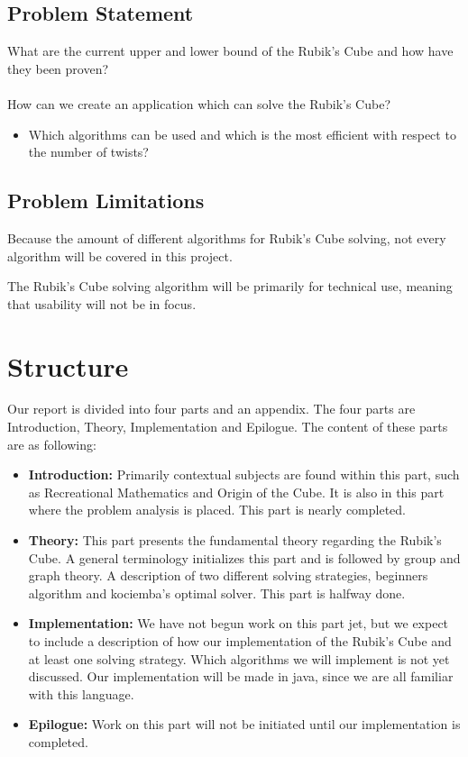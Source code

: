 \documentclass{article}
\begin{document}
\subsection{Problem Statement}
What are the current upper and lower bound of the Rubik's Cube and how have they been proven? \\
\\
How can we create an application which can solve the Rubik's Cube?
\begin{itemize}
	\item Which algorithms can be used and which is the most efficient with respect to the number of twists?
\end{itemize}

\subsection{Problem Limitations}
Because the amount of different algorithms for Rubik's Cube solving, not every algorithm will be covered in this project.

The Rubik's Cube solving algorithm will be primarily for technical use, meaning that usability will not be in focus.

\section{Structure}
Our report is divided into four parts and an appendix. The four parts are Introduction, Theory, Implementation and Epilogue.
The content of these parts are as following:
\begin{itemize}
	\item \textbf{Introduction:} Primarily contextual subjects are found within this part, such as Recreational Mathematics and Origin of the Cube. It is also in this part where the problem analysis is placed. This part is nearly completed.
	\item \textbf{Theory:} This part presents the fundamental theory regarding the Rubik's Cube. A general terminology initializes this part and is followed by group and graph theory. A description of two different solving strategies, beginners algorithm and kociemba's optimal solver. This part is halfway done.
	
	\item \textbf{Implementation:} We have not begun work on this part jet, but we expect to include a description of how our implementation of the Rubik's Cube and at least one solving strategy. Which algorithms we will implement is not yet discussed.
	 Our implementation will be made in java, since we are all familiar with this language.
	\item \textbf{Epilogue:} Work on this part will not be initiated until our implementation is completed.
\end{itemize}
\end{document}
